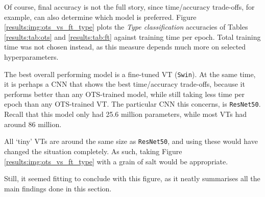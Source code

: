 Of course, final accuracy is not the full story, since time/accuracy trade-offs, for example, can also determine which model is preferred. Figure \ref{results:img:ots_vs_ft_type} plots the \textit{Type classification} accuracies of Tables \ref{results:tab:ots} and \ref{results:tab:ft} against training time per epoch. Total training time was not chosen instead, as this measure depends much more on selected hyperparameters.

The best overall performing model is a fine-tuned VT (\texttt{Swin}). At the same time, it is perhaps a CNN that shows the best time/accuracy trade-offs, because it performs better than any OTS-trained model, while still taking less time per epoch than any OTS-trained VT. The particular CNN this concerns, is \texttt{ResNet50}. Recall that this model only had 25.6 million parameters, while most VTs had around 86 million.

All `tiny' VTs are around the same size as \texttt{ResNet50}, and using these would have changed the situation completely. As such, taking Figure \ref{results:img:ots_vs_ft_type} with a grain of salt would be appropriate.

Still, it seemed fitting to conclude with this figure, as it neatly summarises all the main findings done in this section.
